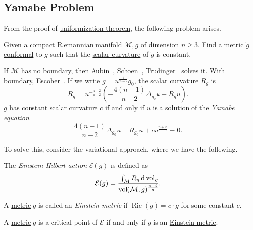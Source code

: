 \subsection{Yamabe Problem}
From the proof of \hyperref[thm:uniformization]{uniformization theorem}, the following problem arises.

\begin{problem}\label{prb:Yamabe}
Given a compact \hyperref[def:Riemannian-manifold]{Riemannian manifold} \(\mathcal{M} , g\) of dimension \(n \geq 3\). Find a \hyperref[def:Riemannian-metric]{metric} \(\widetilde{g} \) \hyperref[def:conformal]{conformal} to \(g\) such that the \hyperref[def:Ricci-scalar-curvature]{scalar curvature} of \(\widetilde{g} \) is constant.
\end{problem}

If \(\mathcal{M} \) has no boundary, then Aubin~\cite{Aubin1976ProblmesIE, Aubin1976EquationsDN}, Schoen~\cite{Schoen1984ConformalDO}, Trudinger~\cite{ASNSP_1968_3_22_2_265_0} solves it. With boundary, Escober~\cite{escobar1992yamabe}. If we write \(g = u^{\frac{4}{n-2}} g_0\), the \hyperref[def:Ricci-scalar-curvature]{scalar curvature} \(R_g\) is
\begin{equation}\label{eq:lec28}
	R_g
	= u^{-\frac{u+2}{n-2}} \left( - \frac{4(n-1)}{n-2} \Delta _{g_0} u + R_g u \right) .
\end{equation}
\(g\) has constant \hyperref[def:Ricci-scalar-curvature]{scalar curvature} \(c\) if and only if \(u\) is a solution of the \emph{Yamabe equation}
\begin{equation}\label{eq:Yamabe}
	\frac{4(n-1)}{n-2} \Delta _{g_0} u - R_{g_0} u + cu^{\frac{n+2}{n-2}} = 0.
\end{equation}

To solve this, consider the variational approach, where we have the following.

\begin{definition}\label{def:Einstein-Hilbert-action}
	The \emph{Einstein-Hilbert action} \(\mathcal{E} (g)\) is defined as
	\[
		\mathcal{E} (g) = \cfrac{\int _\mathcal{M} R_g \,\mathrm{d} \mathop{\mathrm{vol}} _g}{\mathop{\mathrm{vol}}(\mathcal{M} , g)^{\frac{n-2}{n}} }.
	\]
\end{definition}

\begin{definition}\label{def:Einstein-metric}
	A \hyperref[def:Riemannian-metric]{metric} \(g\) is called an \emph{Einstein metric} if \(\mathop{\mathrm{Ric}}(g) = c\cdot g \) for some constant \(c\).
\end{definition}
\begin{remark}
	A \hyperref[def:Riemannian-metric]{metric} \(g\) is a critical point of \(\mathcal{E} \) if and only if \(g\) is an \hyperref[def:Einstein-metric]{Einstein metric}.
\end{remark}

